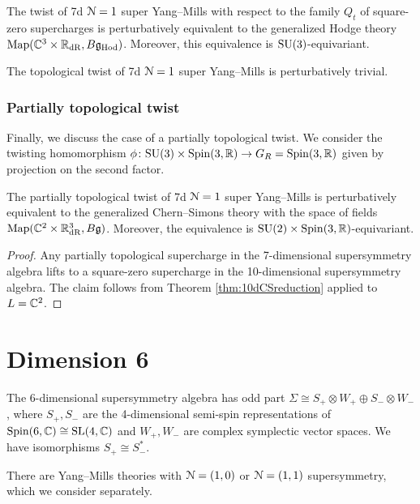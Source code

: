 \documentclass[10pt, oneside]{article}
\newcommand{\Hod}{\mathrm{Hod}}
\begin{document}
\begin{theorem}
The twist of 7d $\mathcal N=1$ super Yang--Mills with respect to the family $Q_t$ of square-zero supercharges is perturbatively equivalent to the generalized Hodge theory $\map(\CC^3\times \RR_{\mr{dR}}, B\fg_{\Hod})$. Moreover, this equivalence is $\mathrm{SU}(3)$-equivariant.
\label{thm:7dHodgetwist}
\end{theorem}

\begin{corollary}
The topological twist of 7d $\mathcal N=1$ super Yang--Mills is perturbatively trivial.
\end{corollary}

\subsubsection{Partially topological twist}
\label{sect:7dpartialtwist}

Finally, we discuss the case of a partially topological twist. We consider the twisting homomorphism $\phi\colon \mathrm{SU}(3)\times \mathrm{Spin}(3, \mathbb R)\rightarrow G_R=\mathrm{Spin}(3, \mathbb R)$ given by projection on the second factor.

\begin{theorem}
The partially topological twist of 7d $\mathcal N=1$ super Yang--Mills is perturbatively equivalent to the generalized Chern--Simons theory with the space of fields $\operatorname{Map}(\mathbb C^2\times \mathbb R^3_{\mathrm{dR}}, B\mathfrak g)$. Moreover, the equivalence is $\mathrm{SU}(2)\times \mathrm{Spin}(3, \mathbb R)$-equivariant.
\label{thm:7dpartiallytopologicaltwist}
\end{theorem}
\begin{proof}
Any partially topological supercharge in the 7-dimensional supersymmetry algebra lifts to a square-zero supercharge in the 10-dimensional supersymmetry algebra. The claim follows from Theorem \ref{thm:10dCSreduction} applied to $L=\mathbb C^2$.
\end{proof}

\section{Dimension 6}

The 6-dimensional supersymmetry algebra has odd part $\Sigma\cong S_+\otimes W_+\oplus S_-\otimes W_-$, where $S_+, S_-$ are the 4-dimensional semi-spin representations of $\mathrm{Spin}(6, \mathbb C)\cong \mathrm{SL}(4, \mathbb C)$ and $W_+, W_-$ are complex symplectic vector spaces. We have isomorphisms $S_+\cong S_-^*$.

There are Yang--Mills theories with $\mathcal N=(1, 0)$ or $\mathcal N=(1, 1)$ supersymmetry, which we consider separately.
\end{document}

